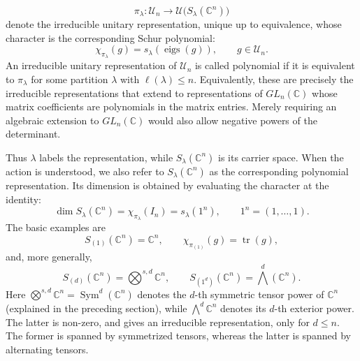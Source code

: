 \documentclass[11pt,showkeys]{amsart}
\begin{document}
\[
    \pi_\lambda:
    \mathcal U_n
    \longrightarrow
    \mathcal U\bigl(S_\lambda(\mathbb C^n)\bigr)
\]
denote the  irreducible unitary representation, unique up to equivalence, whose character
is the corresponding Schur polynomial:
\[
    \chi_{\pi_\lambda}(g)
    =
    s_\lambda(\operatorname{eigs}(g)),
    \qquad g\in\mathcal U_n.
\]
An irreducible unitary representation of \(\mathcal U_n\) is called
polynomial if it is equivalent to \(\pi_\lambda\) for some partition
\(\lambda\) with \(\ell(\lambda)\leq n\). Equivalently, these are
precisely the irreducible representations that extend to representations
of \(GL_n(\mathbb C)\) whose matrix coefficients are polynomials in the
matrix entries. Merely requiring an algebraic extension to
\(GL_n(\mathbb C)\) would also allow negative powers of the determinant.

Thus \(\lambda\) labels the representation, while
\(S_\lambda(\mathbb C^n)\) is its carrier space. When the action is
understood, we also refer to \(S_\lambda(\mathbb C^n)\) as the
corresponding polynomial representation. Its dimension is obtained by
evaluating the character at the identity:
\[
        \dim S_\lambda(\mathbb C^n)
        =
        \chi_{\pi_\lambda}(I_n)
        =
        s_\lambda(1^n),
        \qquad
        1^n=(1,\ldots,1).
\]
The basic examples are
\[
        S_{(1)}(\mathbb C^n)
        =
        \mathbb C^n,
        \qquad
        \chi_{\pi_{(1)}}(g)
        =
        \operatorname{tr}(g),
\]
and, more generally,
\[
        S_{(d)}(\mathbb C^n)
        =
        \bigotimes^{s,d} \mathbb C^n,
        \qquad
        S_{(1^d)}(\mathbb C^n)
        =
        \bigwedge^d(\mathbb C^n).
\]
Here
\(
    \bigotimes\nolimits^{s,d}\mathbb C^n
    =
    \operatorname{Sym}^d(\mathbb C^n)
\)
denotes the \(d\)-th symmetric tensor power of \(\mathbb C^n\)
(explained in the preceding section), while
\(    \bigwedge\nolimits^d\mathbb C^n
\)
denotes its \(d\)-th exterior power. The latter is non-zero, and gives
an irreducible representation, only for \(d\leq n\). The former is
spanned by symmetrized tensors, whereas the latter is spanned by
alternating tensors.
\end{document}

